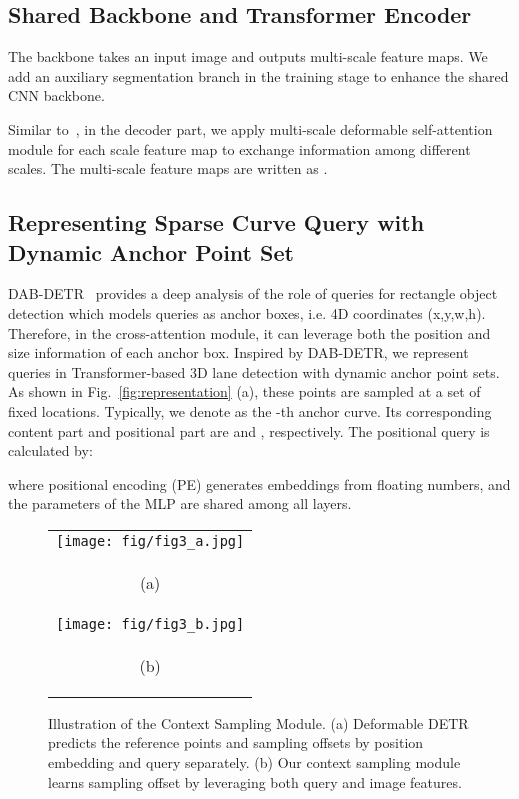 \documentclass[letterpaper, 10 pt, conference]{ieeeconf}
\begin{document}
\subsection{Shared Backbone and Transformer Encoder}
The backbone takes an input image and outputs multi-scale feature maps. We add an auxiliary segmentation branch in the training stage to enhance the shared CNN backbone.

Similar to~\cite{zhu2020deformable}, in the decoder part, we apply multi-scale deformable self-attention module for each scale feature map to exchange information among different scales. The multi-scale feature maps are written as .

\subsection{Representing Sparse Curve Query with Dynamic Anchor Point Set}

DAB-DETR~\cite{liu2022dab} provides a deep analysis of the role of queries for rectangle object detection which models queries as anchor boxes, i.e. 4D coordinates (x,y,w,h). Therefore, in the cross-attention module, it can leverage both the position and size information of each anchor box. Inspired by DAB-DETR, we represent queries in Transformer-based 3D lane detection with dynamic anchor point sets. As shown in Fig.~\ref{fig:representation} (a), these points are sampled at a set of fixed  locations. Typically, we denote  as the -th anchor curve.
Its corresponding content part and positional part are  and , respectively. The positional query  is calculated by:


where positional encoding (PE) generates embeddings from floating numbers, and the parameters of the MLP are shared among all layers. 

\begin{figure}[ht]
\centering
  \begin{tabular}{c}
   \texttt{[image: fig/fig3\_a.jpg]}\\
   \begin{scriptsize}  
   (a)
   \end{scriptsize} \\
   \texttt{[image: fig/fig3\_b.jpg]}\\
   \begin{scriptsize}  
   (b)
   \end{scriptsize}  \\
 \end{tabular}
\caption{Illustration of the Context Sampling Module. (a) Deformable DETR\cite{zhu2020deformable} predicts the reference points and sampling offsets by position embedding and query separately. (b) Our context sampling module learns sampling offset by leveraging both query and image features.}
\label{fig:context-sampling}
\end{figure}
\end{document}
